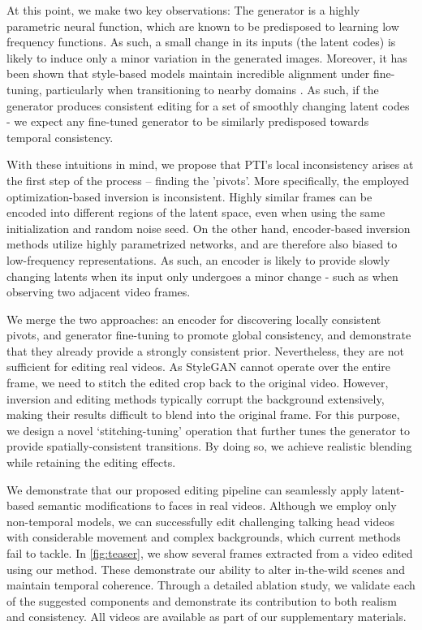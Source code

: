 At this point, we make two key observations: The generator is a highly parametric neural function, which are known to be predisposed to learning low frequency functions. As such, a small change in its inputs (the latent codes) is likely to induce only a minor variation in the generated images. Moreover, it has been shown that style-based models maintain incredible alignment under fine-tuning, particularly when transitioning to nearby domains \cite{wu2021stylealign,pinkney2020resolution,gal2021stylegannada}. As such, if the generator produces consistent editing for a set of smoothly changing latent codes - we expect any fine-tuned generator to be similarly predisposed towards temporal consistency. 

With these intuitions in mind, we propose that PTI's local inconsistency arises at the first step of the process -- finding the 'pivots'. More specifically, the employed optimization-based inversion is inconsistent. Highly similar frames can be encoded into different regions of the latent space, even when using the same initialization and random noise seed. On the other hand, encoder-based inversion methods utilize highly parametrized networks, and are therefore also biased to low-frequency representations. As such, an encoder is likely to provide slowly changing latents when its input only undergoes a minor change - such as when observing two adjacent video frames.

We merge the two approaches: an encoder for discovering locally consistent pivots, and generator fine-tuning to promote global consistency, and demonstrate that they already provide a strongly consistent prior.
Nevertheless, they are not sufficient for editing real videos. As StyleGAN cannot operate over the entire frame, we need to stitch the edited crop back to the original video. However, inversion and editing methods typically corrupt the background extensively, making their results difficult to blend into the original frame. For this purpose, we design a novel `stitching-tuning' operation that further tunes the generator to provide spatially-consistent transitions. By doing so, we achieve realistic blending while retaining the editing effects.

We demonstrate that our proposed editing pipeline can seamlessly apply latent-based semantic modifications to faces in real videos. Although we employ only non-temporal models, we can successfully edit challenging talking head videos with considerable movement and complex backgrounds, which current methods fail to tackle. In \cref{fig:teaser}, we show several frames extracted from a video edited using our method. These demonstrate our ability to alter in-the-wild scenes and maintain temporal coherence. Through a detailed ablation study, we validate each of the suggested components and demonstrate its contribution to both realism and consistency. All videos are available as part of our supplementary materials.




